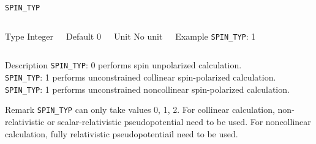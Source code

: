 \begin{frame}[allowframebreaks]{\texttt{SPIN\_TYP}} \label{SPIN_TYP}
\vspace*{-12pt}
\begin{columns}
\begin{block}{Type}
Integer
\end{block}

\begin{block}{Default}
0
\end{block}

\begin{block}{Unit}
No unit
\end{block}

\begin{block}{Example}
\texttt{SPIN\_TYP}: 1
\end{block}
\end{columns}

\begin{block}{Description}
\texttt{SPIN\_TYP}: 0 performs spin unpolarized calculation. \\
\texttt{SPIN\_TYP}: 1 performs unconstrained collinear spin-polarized calculation.  \\
\texttt{SPIN\_TYP}: 1 performs unconstrained noncollinear spin-polarized calculation.   
\end{block}

\begin{block}{Remark}
\texttt{SPIN\_TYP} can only take values 0, 1, 2. For collinear calculation, non-relativistic or scalar-relativistic pseudopotential need to be used. For noncollinear calculation, fully relativistic pseudopotentiail need to be used. 
\end{block}

\end{frame}



